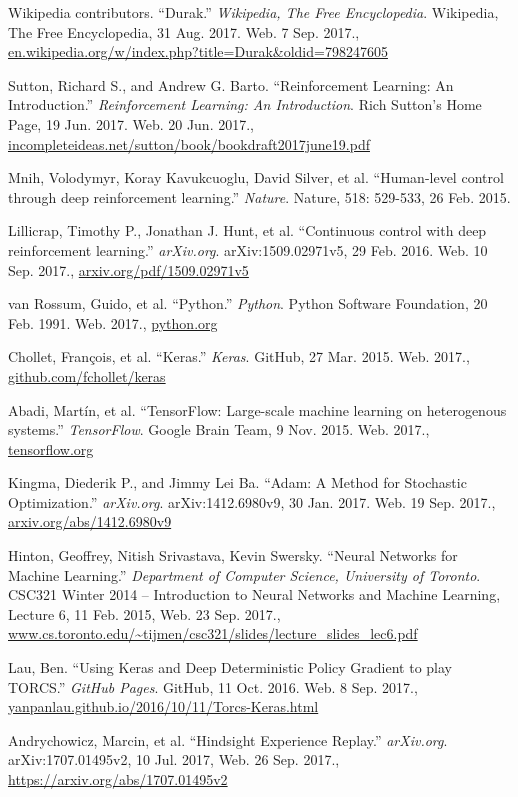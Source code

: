 \documentclass[a4paper,titlepage]{article}
\begin{document}
\begin{thebibliography}{99}

  Wikipedia contributors. ``Durak.'' \emph{Wikipedia, The Free Encyclopedia}. Wikipedia, The Free Encyclopedia, 31 Aug. 2017. Web.
  7 Sep. 2017., \\
  \url{en.wikipedia.org/w/index.php?title=Durak&oldid=798247605}

  Sutton, Richard S., and Andrew G. Barto. ``Reinforcement Learning: An Introduction.'' \emph{Reinforcement Learning: An Introduction}. Rich Sutton's Home Page, 19 Jun. 2017. Web.
  20 Jun. 2017.,
  \url{incompleteideas.net/sutton/book/bookdraft2017june19.pdf}

  Mnih, Volodymyr, Koray Kavukcuoglu, David Silver, et al. ``Human-level control through deep reinforcement learning.'' \emph{Nature}. Nature, 518: 529-533, 26 Feb. 2015.

  Lillicrap, Timothy P., Jonathan J. Hunt, et al. ``Continuous control with deep reinforcement learning.'' \emph{arXiv.org}. arXiv:1509.02971v5, 29 Feb. 2016. Web.
  10 Sep. 2017.,
  \url{arxiv.org/pdf/1509.02971v5}

  van Rossum, Guido, et al. ``Python.'' \emph{Python}. Python Software Foundation, 20 Feb. 1991. Web.
  2017.,
  \url{python.org}

  Chollet, Fran\c{c}ois, et al. ``Keras.'' \emph{Keras}. GitHub, 27 Mar. 2015. Web.
  2017.,
  \url{github.com/fchollet/keras}

  Abadi, Martín, et al. ``TensorFlow: Large-scale machine learning on heterogenous systems.'' \emph{TensorFlow}. Google Brain Team, 9 Nov. 2015. Web.
  2017.,
  \url{tensorflow.org}

  Kingma, Diederik P., and Jimmy Lei Ba. ``Adam: A Method for Stochastic Optimization.'' \emph{arXiv.org}. arXiv:1412.6980v9, 30 Jan. 2017. Web.
  19 Sep. 2017.,
  \url{arxiv.org/abs/1412.6980v9}

  Hinton, Geoffrey, Nitish Srivastava, Kevin Swersky. ``Neural Networks for Machine Learning.'' \emph{Department of Computer Science, University of Toronto}. CSC321 Winter 2014 -- Introduction to Neural Networks and Machine Learning, Lecture 6, 11 Feb. 2015, Web. 23 Sep. 2017.,
  \url{www.cs.toronto.edu/~tijmen/csc321/slides/lecture_slides_lec6.pdf}

  Lau, Ben. ``Using Keras and Deep Deterministic Policy Gradient to play TORCS.'' \emph{GitHub Pages}. GitHub, 11 Oct. 2016. Web.
  8 Sep. 2017.,
  \url{yanpanlau.github.io/2016/10/11/Torcs-Keras.html}

  Andrychowicz, Marcin, et al. ``Hindsight Experience Replay.'' \emph{arXiv.org}. arXiv:1707.01495v2, 10 Jul. 2017, Web.
  26 Sep. 2017.,
  \url{https://arxiv.org/abs/1707.01495v2}

\end{thebibliography}
\end{document}
